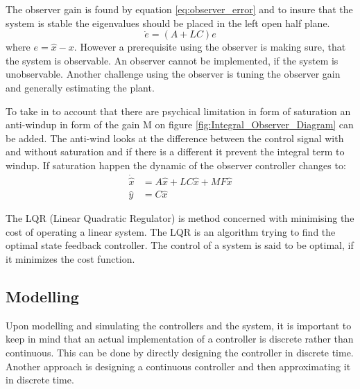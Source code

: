 \documentclass[../../main.tex]{subfiles}
\begin{document}
The observer gain is found by equation \ref{eq:observer_error} and to insure that the system is stable the eigenvalues should be placed in the left open half plane.
\begin{equation}\label{eq:observer_error}
    \Dot{e}=(A+LC)e
\end{equation}
where $e=\hat{x}-x$. However a prerequisite using the observer is making sure, that the system is observable. An observer cannot be implemented, if the system is unobservable. Another challenge using the observer is tuning the observer gain and generally estimating the plant. 

To take in to account that there are psychical limitation in form of saturation an anti-windup in form of the gain M on figure \ref{fig:Integral_Observer_Diagram} can be added. The anti-wind looks at the difference between the control signal with and without saturation and if there is a different it prevent the integral term to windup. 
If saturation happen the dynamic of the observer controller changes to:
\begin{equation}\label{eq:anti-windup_state_space}
    \begin{split}
        \Dot{\hat{x}}&=A\hat{x}+LC\hat{x}+MF\hat{x}\\
        \hat{y}&=C\hat{x}
    \end{split}
\end{equation}

The LQR (Linear Quadratic Regulator) is method concerned with minimising the cost of operating a linear system. The LQR is an algorithm trying to find the optimal state feedback controller. The control of a system is said to be optimal, if it minimizes the cost function.
\subsection*{Modelling}
Upon modelling and simulating the controllers and the system, it is important to keep in mind that an actual implementation of a controller is discrete rather than continuous. This can be done by directly designing the controller in discrete time. Another approach is designing a continuous controller and then approximating it in discrete time.
\end{document}
